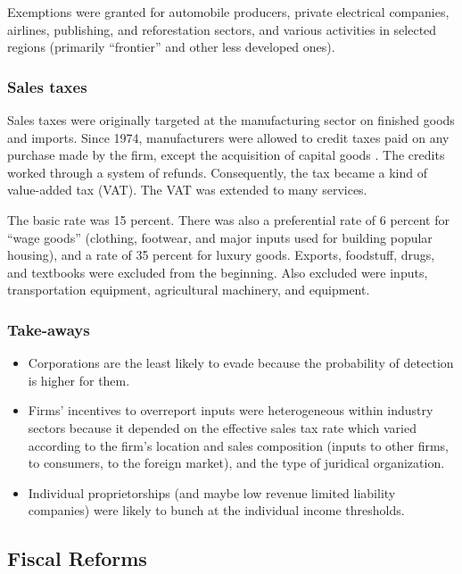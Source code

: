 \documentclass[
  12pt]{article}
\providecommand{\tightlist}{%
  \setlength{\itemsep}{0pt}\setlength{\parskip}{0pt}}\usepackage{longtable,booktabs,array}
\begin{document}
Exemptions were granted for automobile producers, private electrical
companies, airlines, publishing, and reforestation sectors, and various
activities in selected regions (primarily ``frontier'' and other less
developed ones).

\subsubsection{Sales taxes}\label{sales-taxes}

Sales taxes were originally targeted at the manufacturing sector on
finished goods and imports. Since 1974, manufacturers were allowed to
credit taxes paid on any purchase made by the firm, except the
acquisition of capital goods \citep{Perry1990}. The credits worked
through a system of refunds. Consequently, the tax became a kind of
value-added tax (VAT). The VAT was extended to many services.

The basic rate was 15 percent. There was also a preferential rate of 6
percent for ``wage goods'' (clothing, footwear, and major inputs used
for building popular housing), and a rate of 35 percent for luxury
goods. Exports, foodstuff, drugs, and textbooks were excluded from the
beginning. Also excluded were inputs, transportation equipment,
agricultural machinery, and equipment.

\subsubsection{Take-aways}\label{take-aways}

\begin{itemize}
\tightlist
\item
  Corporations are the least likely to evade because the probability of
  detection is higher for them.
\item
  Firms' incentives to overreport inputs were heterogeneous within
  industry sectors because it depended on the effective sales tax rate
  which varied according to the firm's location and sales composition
  (inputs to other firms, to consumers, to the foreign market), and the
  type of juridical organization.
\item
  Individual proprietorships (and maybe low revenue limited liability
  companies) were likely to bunch at the individual income thresholds.
\end{itemize}

\subsection{Fiscal Reforms}\label{fiscal-reforms}
\end{document}
